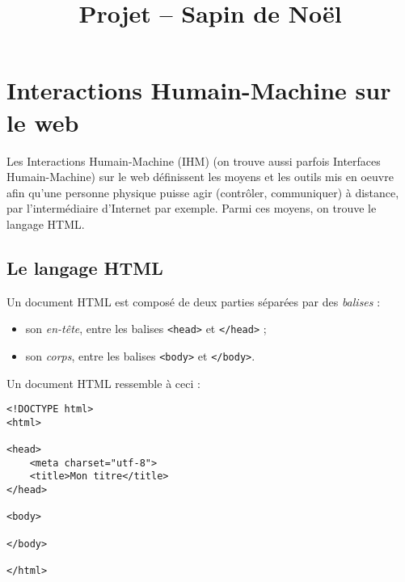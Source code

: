 \documentclass[a4paper,dvipsnames]{article}
\begin{document}
\title{Projet -- Sapin de Noël}

\pagestyle{empty}

\author{}

\date{}

\maketitle{}

\thispagestyle{empty}

\section{Interactions Humain-Machine sur le web}
Les Interactions Humain-Machine (IHM) (on trouve aussi parfois Interfaces Humain-Machine) sur le web définissent les moyens et les outils mis en oeuvre afin qu'une personne physique puisse agir (contrôler, communiquer) à distance, par l'intermédiaire d'Internet par exemple. Parmi ces moyens, on trouve le langage HTML.

\subsection{Le langage HTML}
Un document HTML est composé de deux parties séparées par des \textit{balises} :
\begin{itemize}
  \item son \textit{en-tête}, entre les balises \texttt{<head>} et \texttt{</head>} ;
  \item son \textit{corps}, entre les balises \texttt{<body>} et \texttt{</body>}.
\end{itemize}

Un document HTML ressemble à ceci :

\begin{verbatim}
<!DOCTYPE html>
<html>

<head>
    <meta charset="utf-8">
    <title>Mon titre</title>
</head>

<body>

</body>

</html>
\end{verbatim}

\bigskip
\end{document}
